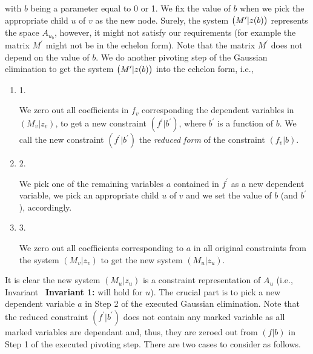 \documentclass[10pt,a4paper]{article}
\begin{document}
with $b$ being a parameter equal to 0 or 1.
We fix the value of $b$ when we pick the appropriate child $u$ of $v$ as the new node.
Surely, the system $\bigl{(}M^{\prime}|z(b)\bigr{)}$ represents the space $A_{u_{b}}$, however, it might not satisfy our requirements (for example the matrix $M^{\prime}$ might not be in the echelon form).
Note that the matrix $M^{\prime}$ does not depend on the value of $b$.
We do another pivoting step of the Gaussian elimination to get the system $\bigl{(}M^{\prime}|z(b)\bigr{)}$ into the echelon form, i.e.,\par


\begin{enumerate}


\item[] 
1. 


We zero out all coefficients in $f_{v}$ corresponding the dependent variables in $(M_{v}|z_{v})$, to get a new constraint $(f^{\prime}|b^{\prime})$, where $b^{\prime}$ is a function of $b$. We call the new constraint $(f^{\prime}|b^{\prime})$ the \emph{reduced form} of the constraint $(f_{v}|b)$.\par





\item[] 
2. 


We pick one of the remaining variables $a$ contained in $f^{\prime}$ as a new dependent variable, we pick an appropriate child $u$ of $v$ and we set the value of $b$ (and $b^{\prime}$), accordingly.\par





\item[] 
3. 


We zero out all coefficients corresponding to $a$ in all original constraints from the system $(M_{v}|z_{v})$ to get the new system $(M_{u}|z_{u})$.\par





\end{enumerate}


It is clear the new system $(M_{u}|z_{u})$ is a constraint representation of $A_{u}$ (i.e., Invariant \textbf{ Invariant 1:} will hold for $u$).
The crucial part is to pick a new dependent variable $a$ in Step 2 of the executed Gaussian elimination.
Note that the reduced constraint $(f^{\prime}|b^{\prime})$ does not contain any marked variable as all marked variables are dependant and, thus, they are zeroed out from $(f|b)$ in Step 1 of the executed pivoting step.
There are two cases to consider as follows.\par
\end{document}
